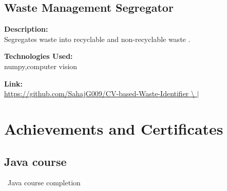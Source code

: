 \documentclass[a4paper,10pt]{article}
\begin{document}
\subsection*{Waste Management Segregator}

\noindent
\begin{minipage}[t]{0.4\textwidth}
  \textbf{Description:}\\
  Segregates waste into recyclable and non-recyclable waste .
\end{minipage}%
\begin{minipage}[t]{0.4\textwidth}
  \textbf{Technologies Used:}\\
  numpy,computer vision
\end{minipage}%
\begin{minipage}[t]{0.2\textwidth}
  \textbf{Link:}\\
  \url{https://github.com/SahajG009/CV-based-Waste-Identifier \ }$|$
\end{minipage}







\section{Achievements and Certificates}

\subsection*{Java course}

\begin{multicols}{2}
    \begin{itemize}
        \ Java course completion
    \end{itemize}
    
    \columnbreak
\end{multicols}
\end{document}
